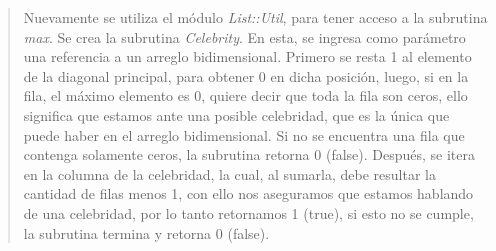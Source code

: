 \documentclass{article}
\begin{document}
  

  \begin{quote}
    Nuevamente se utiliza el módulo \textit{List::Util}, para tener acceso a la subrutina \textit{max}. Se crea la subrutina \textit{Celebrity}. En esta, se ingresa como parámetro una referencia a un arreglo bidimensional. Primero se resta 1 al elemento de la diagonal principal, para obtener 0 en dicha posición, luego, si en la fila, el máximo elemento es 0, quiere decir que toda la fila son ceros, ello significa que estamos ante una posible celebridad, que es la única que puede haber en el arreglo bidimensional. Si no se encuentra una fila que contenga solamente ceros, la subrutina retorna 0 (false). Después, se itera en la columna de la celebridad, la cual, al sumarla, debe resultar la cantidad de filas menos 1, con ello nos aseguramos que estamos hablando de una celebridad, por lo tanto retornamos 1 (true), si esto no se cumple, la subrutina termina y retorna 0 (false).
  \end{quote}


\clearpage
	
%
%
%
			
\end{document}
